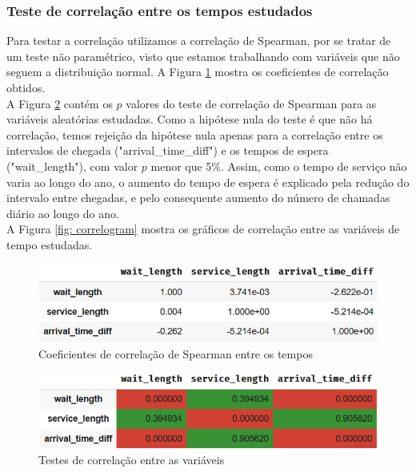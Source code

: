 \subsubsection{Teste de correlação entre os tempos estudados}
\label{section: correlacao-anual}
Para testar a correlação utilizamos a correlação de Spearman, por se tratar de um teste não paramétrico, visto que estamos trabalhando com variáveis que não seguem a distribuição normal. A Figura \ref*{fig: corr-spearman-1} mostra os coeficientes de correlação obtidos.\\
A Figura \ref*{fig: spearman-test-1} contém os $p$ valores do teste de correlação de Spearman para as variáveis aleatórias estudadas. Como a hipótese nula do teste é que não há correlação, temos rejeição da hipótese nula apenas para a correlação entre os intervalos de chegada ("arrival\_time\_diff") e os tempos de espera ("wait\_length"), com valor $p$ menor que 5\%. Assim, como o tempo de serviço não varia ao longo do ano, o aumento do tempo de espera é explicado pela redução do intervalo entre chegadas, e pelo consequente aumento do número de chamadas diário ao longo do ano.\\
A Figura \ref*{fig: correlogram} mostra os gráficos de correlação entre as variáveis de tempo estudadas.

\begin{figure}[H]
    \includegraphics{analise-de-dados/anual/corr-spearman.png}
    \caption{Coeficientes de correlação de Spearman entre os tempos}
    \label{fig: corr-spearman-1}
\end{figure}

\begin{figure}[H]
    \includegraphics{analise-de-dados/anual/spearman-test.png}
    \caption{Testes de correlação entre as variáveis}
    \label{fig: spearman-test-1}
\end{figure}

